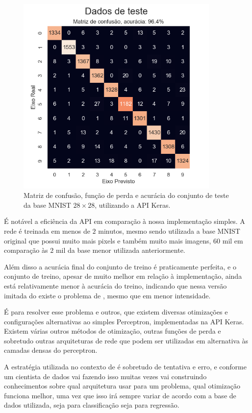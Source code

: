 \begin{figure}[htb]
\centering
\includegraphics[width=10cm]{figuras/keras_test}
\caption{Matriz de confusão, função de perda e acurácia do conjunto de teste da base MNIST $28\times28$, utilizando a API Keras.}
\label{fig:keras_test}
\end{figure}

É notável a eficiência da API em comparação à nossa implementação simples. A rede é treinada em menos de $2$ minutos, mesmo sendo utilizada a base MNIST original que possui muito mais pixels e também muito mais imagens, $60$ mil em comparação às $2$ mil da base menor utilizada anteriormente. 

Além disso a acurácia final do conjunto de treino é praticamente perfeita, e o conjunto de treino, apesar de muito melhor em relação à implementação, ainda está relativamente menor à acurácia do treino, indicando que nessa versão imitada do  existe o problema de , mesmo que em menor intensidade.

É para resolver esse problema e outros, que existem diversas otimizações e configurações alternativas ao simples Perceptron, implementadas na API Keras. Existem várias outros métodos de otimização, outras funções de perda e sobretudo outras arquiteturas de rede que podem ser utilizadas em alternativa às camadas densas do perceptron. 

A estratégia utilizada no contexto de  é sobretudo de tentativa e erro, e conforme um cientista de dados vai fazendo isso muitas vezes vai construindo conhecimentos sobre qual arquitetura usar para um problema, qual otimização funciona melhor, uma vez que isso irá sempre variar de acordo com a base de dados utilizada, seja para classificação seja para regressão.

